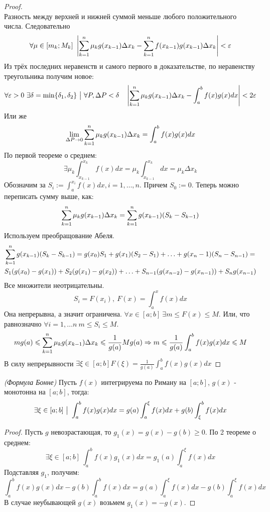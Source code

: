 \begin{proof}
\[	\]
	Разность между верхней и нижней суммой меньше любого положительного числа. Следовательно
	\[
		\forall \mu \in [m_k;M_k]\ \left|\sum\limits_{k = 1}^n\mu_kg(x_{k - 1}) \Delta x_k - \sum\limits_{k = 1}^nf(x_{k - 1})g(x_{k - 1}) \Delta x_k \right| < \varepsilon
	\]
	Из трёх последних неравенств и самого первого в доказательстве, по неравенству треугольника получим новое:
	\[
		\forall \varepsilon > 0\ \exists \delta = \min \{\delta_1, \delta_2\} \ \big|\  \forall P, \Delta P < \delta \quad \left|\sum\limits_{k = 1}^n\mu_kg(x_{k - 1}) \Delta x_k - \int_a^bf(x)g(x)dx\right| < 2\varepsilon
	\]
	Или же
	\[
		\lim\limits_{\Delta P \to 0} \sum\limits_{k = 1}^n\mu_kg(x_{k - 1})\Delta x_k = \int_a^bf(x)g(x)dx
	\]
	По первой теореме о среднем:
	\[
		\exists \mu_k \int_{x_{k - 1}}^{x_k}f(x)dx = \mu_k\int_{x_{k - 1}}^{x_k}dx = \mu_k\Delta x_k
	\]
	Обозначим за $S_i := \int_a^{x_i}f(x)dx, i = 1,\ldots, n$. Причем $S_0 := 0$. Теперь можно переписать сумму выше, как:
	\[
		\sum\limits_{k = 1}^n\mu_kg(x_{k - 1})\Delta x_k = \sum\limits_{k = 1}^ng(x_{k - 1})(S_k - S_{k - 1})
	\]
	Используем преобращование Абеля.
	\begin{multline*}
		\sum\limits_{k = 1}^ng(x_{k - 1})(S_k - S_{k - 1}) = g(x_0)S_1 +g(x_1)(S_2 - S_1) + \ldots + g(x_n - 1)(S_n - S_{n - 1}) =
		\\
		 S_1(g(x_0) - g(x_1)) + S_2(g(x_1) - g(x_2)) + \ldots + S_{n - 1}(g(x_{n - 2}) - g(x_{n - 1})) + S_ng(x_{n - 1})
	\end{multline*}
	Все множители неотрицательны.
	\[
		S_i = F(x_i),\ F(x) = \int_a^xf(x)dx
	\]
	Она непрерывна, а значит ограничена. $\forall x \in [a;b]\ \exists m \leq F(x) \leq M$. Или, что равнозначно $\forall i = 1,\ldots n\ m \leq S_i \leq M$. 
	\[
		mg(a) \leqslant \sum\limits_{k = 1}^n\mu_kg(x_{k - 1})\Delta x_k \leqslant \frac{1}{g(a)}Mg(a) \Rightarrow m \leqslant \frac{1}{g(a)}\int_a^bf(x)g(x)dx \leqslant M
	\]
	В силу непрерывности $\exists \xi \in [a;b] F(\xi) = \frac{1}{g(a)}\int_a^bf(x)g(x)dx$
\end{proof}


\begin{corollary} \textit{(Формула Бонне)}
	Пусть $f(x)$  интегрируема по Риману на $[a;b]$, $g(x)$ - монотонна на $[a;b]$, тогда:
	\[
		\exists \xi \in [a;b] \ \big|\  \int_a^bf(x)g(x)dx = g(a)\int_a^\xi f(x)dx + g(b)\int_\xi^bf(x)dx
	\]
\end{corollary}

\begin{proof}
	Пусть $g$  невозрастающая, то $g_1(x) = g(x) - g(b) \geq 0$. По 2 теореме о среднем:
	\[
		\exists \xi \in [a;b]\ \int_a^bf(x)g_1(x)dx = g_1(a)\int_a^\xi f(x)dx
	\]
	Подставляя $g_1$, получим:
	\[
		\int_a^bf(x)g(x)dx - g(b) \int_a^bf(x)dx = g(a)\int_a^\xi f(x)dx - g(b)\int_a^\xi f(x)dx
	\]
	В случае неубывающей $g(x)$ возьмем $g_1(x) = - g(x)$.
\end{proof}

